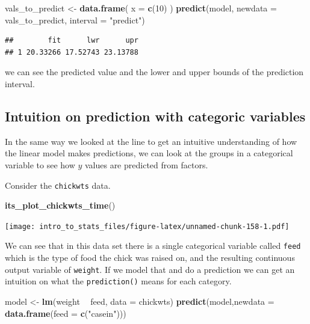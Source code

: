 \documentclass[
]{book}
\newenvironment{Shaded}{\begin{snugshade}}{\end{snugshade}}
\newcommand{\DataTypeTok}[1]{\textcolor[rgb]{0.13,0.29,0.53}{#1}}
\newcommand{\DecValTok}[1]{\textcolor[rgb]{0.00,0.00,0.81}{#1}}
\newcommand{\KeywordTok}[1]{\textcolor[rgb]{0.13,0.29,0.53}{\textbf{#1}}}
\newcommand{\NormalTok}[1]{#1}
\newcommand{\OperatorTok}[1]{\textcolor[rgb]{0.81,0.36,0.00}{\textbf{#1}}}
\newcommand{\StringTok}[1]{\textcolor[rgb]{0.31,0.60,0.02}{#1}}
\begin{document}
\begin{Shaded}
\begin{Highlighting}[]
\NormalTok{vals_to_predict <-}\StringTok{ }\KeywordTok{data.frame}\NormalTok{( }\DataTypeTok{x =} \KeywordTok{c}\NormalTok{(}\DecValTok{10}\NormalTok{) )}
\KeywordTok{predict}\NormalTok{(model, }\DataTypeTok{newdata =}\NormalTok{ vals_to_predict, }\DataTypeTok{interval =} \StringTok{"predict"}\NormalTok{)}
\end{Highlighting}
\end{Shaded}

\begin{verbatim}
##        fit      lwr      upr
## 1 20.33266 17.52743 23.13788
\end{verbatim}

we can see the predicted value and the lower and upper bounds of the prediction interval.

\hypertarget{intuition-on-prediction-with-categoric-variables}{%
\subsection{Intuition on prediction with categoric variables}\label{intuition-on-prediction-with-categoric-variables}}

In the same way we looked at the line to get an intuitive understanding of how the linear model makes predictions, we can look at the groups in a categorical variable to see how \(y\) values are predicted from factors.

Consider the \texttt{chickwts} data.

\begin{Shaded}
\begin{Highlighting}[]
\KeywordTok{its_plot_chickwts_time}\NormalTok{()}
\end{Highlighting}
\end{Shaded}

\texttt{[image: intro\_to\_stats\_files/figure-latex/unnamed-chunk-158-1.pdf]}

We can see that in this data set there is a single categorical variable called \texttt{feed} which is the type of food the chick was raised on, and the resulting continuous output variable of \texttt{weight}. If we model that and do a prediction we can get an intuition on what the \texttt{prediction()} means for each category.

\begin{Shaded}
\begin{Highlighting}[]
\NormalTok{model <-}\StringTok{ }\KeywordTok{lm}\NormalTok{(weight }\OperatorTok{~}\StringTok{ }\NormalTok{feed, }\DataTypeTok{data =}\NormalTok{ chickwts)}
\KeywordTok{predict}\NormalTok{(model,}\DataTypeTok{newdata =} \KeywordTok{data.frame}\NormalTok{(}\DataTypeTok{feed =} \KeywordTok{c}\NormalTok{(}\StringTok{"casein"}\NormalTok{)))}
\end{Highlighting}
\end{Shaded}
\end{document}
